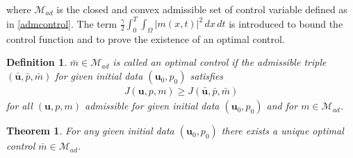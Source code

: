 \documentclass{amsart}
\newtheorem{definition}{Definition}[section]
\newtheorem{theorem}{Theorem}[section]
\newcommand{\algn}[1]{\begin{align} #1 \end{align}}
\newcommand{\mc}[1]{\mathcal{#1}}
\newcommand{\LRp}[1]{\left( #1 \right)}
\begin{document}
where $\mc{M}_{ad}$ is the closed and convex admissible set of control variable defined as in \eqref{admcontrol}. The term $\frac{\gamma}{2} \int_0^T \int_{\Omega} |m(x, t)|^2 \, dx \, dt$ is introduced to bound the control function and to prove the existence of an optimal control. %
\begin{definition}
	$\bar{m} \in \mc{M}_{ad}$ is called an optimal control if the admissible triple $\LRp{\bar{\boldsymbol{u}}, \bar{p}, \bar{m}}$ for given initial data $(\boldsymbol{u}_0, p_0)$ satisfies
	\algn{
		\nonumber J \LRp{\boldsymbol{u}, p, m} \ge J \LRp{\bar{\boldsymbol{u}}, \bar{p}, \bar{m}}
	}
	for all $\LRp{\boldsymbol{u}, p, m}$ admissible for given initial data $(\boldsymbol{u}_0, p_0)$ and for $m \in \mc{M}_{ad}$.
\end{definition}
%
%
\begin{theorem} \label{existence}
	For any given initial data $(\boldsymbol{u}_0, p_0)$ there exists a unique optimal control $\bar{m} \in \mc{M}_{ad}$.
\end{theorem}
%
\end{document}
